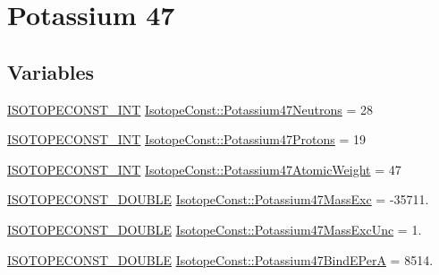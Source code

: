 \hypertarget{group___isotope_const-_potassium-_k47}{}\section{Potassium 47}
\label{group___isotope_const-_potassium-_k47}
\subsection*{Variables}
\begin{DoxyCompactItemize}
\item 
\mbox{\hyperlink{group___isotope_const-_macros_ga5f18360b3e99483a35c32d789e62621c}{I\+S\+O\+T\+O\+P\+E\+C\+O\+N\+S\+T\+\_\+\+I\+NT}} \mbox{\hyperlink{group___isotope_const-_potassium-_k47_gad6b50ad9c198a06fdea849d164071bf9}{Isotope\+Const\+::\+Potassium47\+Neutrons}} = 28
\item 
\mbox{\hyperlink{group___isotope_const-_macros_ga5f18360b3e99483a35c32d789e62621c}{I\+S\+O\+T\+O\+P\+E\+C\+O\+N\+S\+T\+\_\+\+I\+NT}} \mbox{\hyperlink{group___isotope_const-_potassium-_k47_gaad03dcbc9abfc0e340a7dcf739f40fcb}{Isotope\+Const\+::\+Potassium47\+Protons}} = 19
\item 
\mbox{\hyperlink{group___isotope_const-_macros_ga5f18360b3e99483a35c32d789e62621c}{I\+S\+O\+T\+O\+P\+E\+C\+O\+N\+S\+T\+\_\+\+I\+NT}} \mbox{\hyperlink{group___isotope_const-_potassium-_k47_ga02c4c9178ba1db094b195d5841ea359c}{Isotope\+Const\+::\+Potassium47\+Atomic\+Weight}} = 47
\item 
\mbox{\hyperlink{group___isotope_const-_macros_ga8f45a7272ce02c0b4c65c44636ed719a}{I\+S\+O\+T\+O\+P\+E\+C\+O\+N\+S\+T\+\_\+\+D\+O\+U\+B\+LE}} \mbox{\hyperlink{group___isotope_const-_potassium-_k47_ga91696651c6e6d40101c8b411954b4839}{Isotope\+Const\+::\+Potassium47\+Mass\+Exc}} = -\/35711.
\item 
\mbox{\hyperlink{group___isotope_const-_macros_ga8f45a7272ce02c0b4c65c44636ed719a}{I\+S\+O\+T\+O\+P\+E\+C\+O\+N\+S\+T\+\_\+\+D\+O\+U\+B\+LE}} \mbox{\hyperlink{group___isotope_const-_potassium-_k47_gac9c03b5216737a52e4a22c6841228d04}{Isotope\+Const\+::\+Potassium47\+Mass\+Exc\+Unc}} = 1.
\item 
\mbox{\hyperlink{group___isotope_const-_macros_ga8f45a7272ce02c0b4c65c44636ed719a}{I\+S\+O\+T\+O\+P\+E\+C\+O\+N\+S\+T\+\_\+\+D\+O\+U\+B\+LE}} \mbox{\hyperlink{group___isotope_const-_potassium-_k47_gad71afb8a26871f1bf13419cf3fce6992}{Isotope\+Const\+::\+Potassium47\+Bind\+E\+PerA}} = 8514.
\item 

\end{DoxyCompactItemize}

